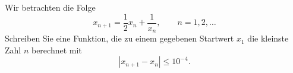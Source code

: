 \begin{aufg}[0]
Wir betrachten die Folge 
\[ x_{n+1} = \frac12 x_n + \frac{1}{x_n}, \qquad n =1,2,\dots \]
Schreiben Sie eine Funktion, die zu einem gegebenen Startwert $x_1$ die kleinste
Zahl $n$ berechnet mit 
\[ |x_{n+1} - x_n| \leq 10^{-4} .\]
\end{aufg}
